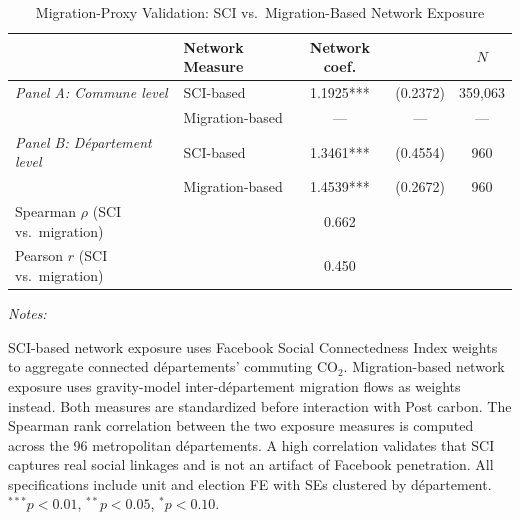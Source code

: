 \begin{table}[!h]
\centering
\caption{Migration-Proxy Validation: SCI vs.\ Migration-Based Network Exposure}
\centering
\fontsize{10}{12}\selectfont
\begin{threeparttable}
\begin{tabular}[t]{llccc}
\toprule
 & Network Measure & Network coef. &  & $N$\\
\midrule
\textit{Panel A: Commune level} & SCI-based & 1.1925*** & (0.2372) & 359,063\\
 & Migration-based & --- & --- & ---\\
\textit{Panel B: D\'{e}partement level} & SCI-based & 1.3461*** & (0.4554) & 960\\
 & Migration-based & 1.4539*** & (0.2672) & 960\\
\midrule Spearman $\rho$ (SCI vs.\ migration) &  & 0.662 &  & \\
Pearson $r$ (SCI vs.\ migration) &  & 0.450 &  & \\
\bottomrule
\end{tabular}
\begin{tablenotes}
\item \textit{Notes:} 
\item SCI-based network exposure uses Facebook Social Connectedness Index weights to aggregate connected d\'{e}partements' commuting CO$_2$. Migration-based network exposure uses gravity-model inter-d\'{e}partement migration flows as weights instead. Both measures are standardized before interaction with Post carbon. The Spearman rank correlation between the two exposure measures is computed across the 96 metropolitan d\'{e}partements. A high correlation validates that SCI captures real social linkages and is not an artifact of Facebook penetration. All specifications include unit and election FE with SEs clustered by d\'{e}partement. $^{***}p<0.01$, $^{**}p<0.05$, $^{*}p<0.10$.
\end{tablenotes}
\end{threeparttable}
\end{table}
